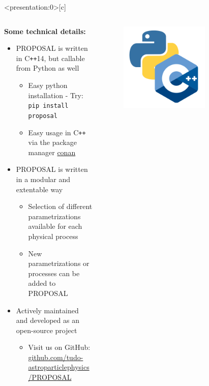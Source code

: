 \begin{frame}<presentation:0>[c]
  \begin{columns}[onlytextwidth]
  \begin{column}{0.6\textwidth}
  \textbf{Some technical details:}
  \begin{itemize}
      \setlength{\itemsep}{3pt}
      \item PROPOSAL is written in C\texttt{++}14, but callable from Python as well
          \begin{itemize}
              \item[\rightarrow] Easy python installation - Try: \texttt{pip install proposal}
              \item[\rightarrow] Easy usage in C\texttt{++} via the package manager \href{https://conan.io/center/proposal}{conan}
          \end{itemize}
      \item PROPOSAL is written in a modular and extentable way
          \begin{itemize}
              \item[\rightarrow] Selection of different parametrizations available for each physical process
              \item[\rightarrow] New parametrizations or processes can be added to PROPOSAL
          \end{itemize} 
      \item Actively maintained and developed as an open-source project
          \begin{itemize}
              \item[\rightarrow] Visit us on GitHub: \url{github.com/tudo-astroparticlephysics/PROPOSAL}
          \end{itemize}
  \end{itemize}
  \end{column}
  \begin{column}{0.4\textwidth}
    \begin{figure}
        \centering
        \includegraphics[width=0.7\textwidth]{logos/cpp-python.png}
    \end{figure}
  \end{column}
  \end{columns}
\end{frame}